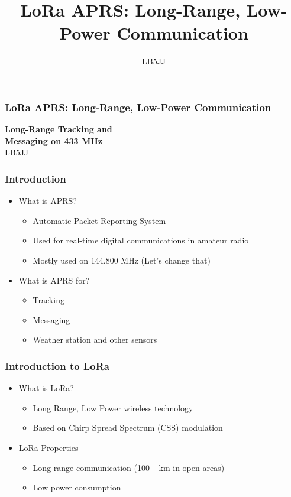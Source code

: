 \documentclass[aspectratio=169]{beamer}
\title[LoRa APRS: Long-Range, Low-Power Communication]{LoRa APRS: Long-Range, Low-Power Communication}
\author{LB5JJ}
\date{}
\begin{document}
\begin{frame}
  \frametitle{LoRa APRS: Long-Range, Low-Power Communication}
  \begin{center}
    {\Huge \textbf{\textcolor{myorange}{Long-Range Tracking and\\Messaging on 433 MHz}}} \\[1cm]
    {\Large \textcolor{mylightgrey}{LB5JJ}}
  \end{center}
\end{frame}

\begin{frame}[t]
  \frametitle{Introduction}
  \begin{itemize}
  \item What is APRS?
  \medskip
  \begin{itemize}
    \item Automatic Packet Reporting System
    \medskip
    \item Used for real-time digital communications in amateur radio
    \medskip
    \item Mostly used on 144.800 MHz (Let's change that)
    \end{itemize}
    \medskip
    \item What is APRS for?
    \medskip
    \begin{itemize}
      \item Tracking
      \medskip
      \item Messaging
      \medskip
      \item Weather station and other sensors
    \end{itemize}
  \end{itemize}
\end{frame}

\begin{frame}[t]
  \frametitle{Introduction to LoRa}
  \begin{itemize}
      \item What is LoRa?
      \medskip
      \begin{itemize}
        \item Long Range, Low Power wireless technology
        \medskip
        \item Based on Chirp Spread Spectrum (CSS) modulation
      \end{itemize}
      \medskip
      \item LoRa Properties
      \medskip
      \begin{itemize}
        \item Long-range communication (100+ km in open areas)
        \medskip
        \item Low power consumption
      \end{itemize}
    \end{itemize}
\end{frame}
\end{document}
